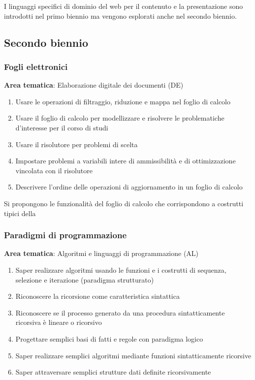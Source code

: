I linguaggi specifici di dominio del web per il contenuto e la presentazione sono introdotti
nel primo biennio ma vengono esplorati anche nel secondo biennio.

\subsection{Secondo biennio}
\label{sec:secondo-biennio}

\subsubsection[Fogli elettronici]{Fogli elettronici}
\label{sec:fogli-elettronici}

\noindent\textbf{Area tematica}: Elaborazione digitale dei documenti (DE)

    
\begin{enumerate}
  \item Usare le operazioni di filtraggio, riduzione e mappa nel foglio di calcolo
  \item Usare il foglio di calcolo per modellizzare e risolvere le problematiche d'interesse per il corso di studi
  \item Usare il risolutore per problemi di scelta
  \item Impostare problemi a variabili intere di ammissibilità e di ottimizzazione vincolata con il risolutore
  \item Descrivere l'ordine delle operazioni di aggiornamento in un foglio di calcolo
\end{enumerate}

Si propongono le funzionalità del foglio di calcolo che corrispondono a costrutti tipici della

\subsubsection[Paradigmi]{Paradigmi di programmazione}
\label{sec:paradigmi}

\noindent\textbf{Area tematica}: Algoritmi e linguaggi di programmazione (AL)

    
\begin{enumerate}
  \item Saper realizzare algoritmi usando le funzioni e  i costrutti di sequenza, selezione e iterazione (paradigma strutturato)
  \item Riconoscere la ricorsione come caratteristica sintattica
  \item Riconoscere se il processo generato da una procedura sintatticamente ricorsiva è lineare o ricorsivo
  \item Progettare semplici basi di fatti e regole con paradigma logico
  \item Saper realizzare semplici algoritmi mediante funzioni sintatticamente ricorsive
  \item Saper attraversare semplici strutture dati definite ricorsivamente
\end{enumerate}

